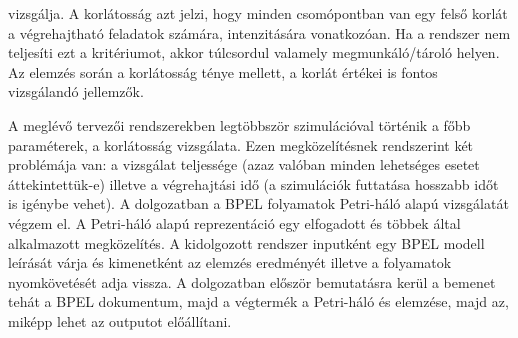 vizsgálja. A korlátosság azt jelzi, hogy minden csomópontban van egy felső korlát a végrehajtható feladatok számára, intenzitására vonatkozóan. Ha a rendszer nem teljesíti ezt a kritériumot, akkor túlcsordul valamely megmunkáló/tároló helyen. Az elemzés során a korlátosság ténye mellett, a korlát értékei is fontos vizsgálandó jellemzők. 

A meglévő tervezői rendszerekben legtöbbször szimulációval történik a főbb paraméterek, a korlátosság vizsgálata. Ezen megközelítésnek rendszerint két problémája van: a vizsgálat teljessége (azaz valóban minden lehetséges esetet áttekintettük-e) illetve a végrehajtási idő (a szimulációk futtatása hosszabb időt is igénybe vehet).
\newpage
A dolgozatban a BPEL folyamatok Petri-háló alapú vizsgálatát végzem el. A Petri-háló alapú reprezentáció egy elfogadott és többek által alkalmazott megközelítés. A kidolgozott rendszer inputként egy  BPEL modell leírását várja és kimenetként az elemzés eredményét illetve a folyamatok nyomkövetését adja vissza. A dolgozatban először bemutatásra kerül a bemenet tehát a BPEL dokumentum, majd a végtermék a Petri-háló és elemzése, majd az, miképp lehet az outputot előállítani.